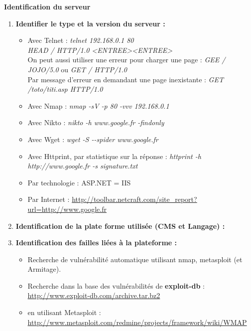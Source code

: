 \documentclass[a4paper,11pt]{article}				    %
\begin{document}
{
\textbf{\Large Identification du serveur}
\begin{enumerate}
	\item \textbf{Identifier le type et la version du serveur :}
	\begin{itemize}
		\item Avec Telnet :
	{\sl \color{blue}
	telnet 192.168.0.1 80\\
	HEAD / HTTP/1.0 <ENTREE><ENTREE>
	}\\
	On peut aussi utiliser une erreur pour charger une page : {\sl \color{blue}GEE / JOJO/5.0} ou {\sl \color{blue}GET / HTTP/1.0}\\
	Par message d'erreur en demandant une page inexistante : {\sl \color{blue}GET /toto/titi.asp HTTP/1.0}
		\item Avec Nmap :
	{\sl \color{blue}nmap -sV -p 80 -vvv 192.168.0.1}
		\item Avec Nikto :
	{\sl \color{blue}nikto -h www.google.fr -findonly}
		\item Avec Wget :
	{\sl \color{blue}wget -S {-}{-}spider www.google.fr}
		\item Avec Httprint, par statistique sur la r\'eponse : 
	{\sl \color{blue}httprint -h http://www.google.fr -s signature.txt}
		\item Par technologie : ASP.NET = IIS
		\item Par Internet : \url{http://toolbar.netcraft.com/site_report?url=http://www.google.fr}
	\end{itemize}

	\item \textbf{Identification de la plate forme utilis\'ee (CMS et Langage) :}

	\item \textbf{Identification des failles li\'ees \`a la plateforme :}
	\begin{itemize}
		\item Recherche de vuln\'erabilit\'e automatique utilisant nmap, metasploit (et Armitage).
		\item Recherche dans la base des vuln\'erabilit\'es de \textbf{exploit-db} :\\
	\url{http://www.exploit-db.com/archive.tar.bz2}
		\item en utilisant Metasploit :\\
		\url{http://www.metasploit.com/redmine/projects/framework/wiki/WMAP}
	\end{itemize}


\end{enumerate}}
\end{document}
